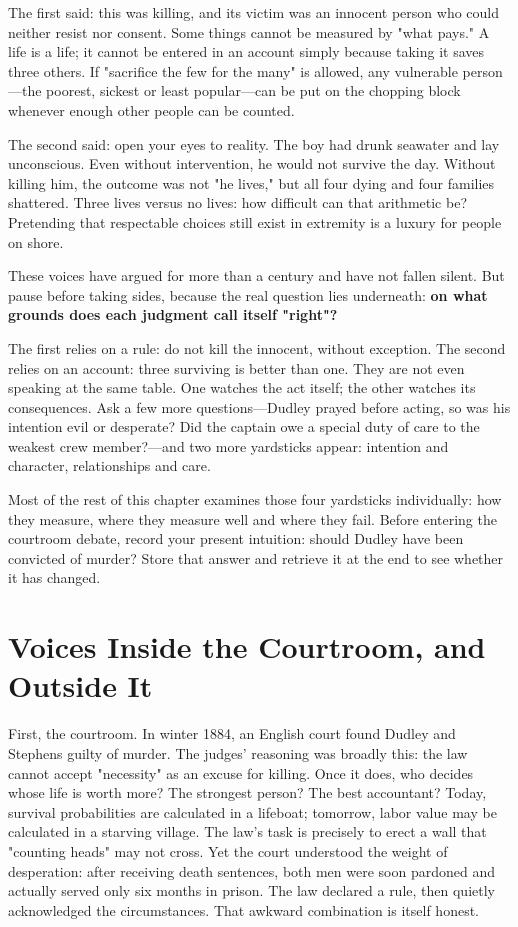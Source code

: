 The first said: this was killing, and its victim was an innocent person who could neither resist nor consent. Some things cannot be measured by "what pays." A life is a life; it cannot be entered in an account simply because taking it saves three others. If "sacrifice the few for the many" is allowed, any vulnerable person---the poorest, sickest or least popular---can be put on the chopping block whenever enough other people can be counted.

The second said: open your eyes to reality. The boy had drunk seawater and lay unconscious. Even without intervention, he would not survive the day. Without killing him, the outcome was not "he lives," but all four dying and four families shattered. Three lives versus no lives: how difficult can that arithmetic be? Pretending that respectable choices still exist in extremity is a luxury for people on shore.

These voices have argued for more than a century and have not fallen silent. But pause before taking sides, because the real question lies underneath: \textbf{on what grounds does each judgment call itself "right"?}

The first relies on a rule: do not kill the innocent, without exception. The second relies on an account: three surviving is better than one. They are not even speaking at the same table. One watches the act itself; the other watches its consequences. Ask a few more questions---Dudley prayed before acting, so was his intention evil or desperate? Did the captain owe a special duty of care to the weakest crew member?---and two more yardsticks appear: intention and character, relationships and care.

Most of the rest of this chapter examines those four yardsticks individually: how they measure, where they measure well and where they fail. Before entering the courtroom debate, record your present intuition: should Dudley have been convicted of murder? Store that answer and retrieve it at the end to see whether it has changed.

\section[Voices Inside and Outside Court]{Voices Inside the Courtroom, and Outside It}
First, the courtroom. In winter 1884, an English court found Dudley and Stephens guilty of murder. The judges' reasoning was broadly this: the law cannot accept "necessity" as an excuse for killing. Once it does, who decides whose life is worth more? The strongest person? The best accountant? Today, survival probabilities are calculated in a lifeboat; tomorrow, labor value may be calculated in a starving village. The law's task is precisely to erect a wall that "counting heads" may not cross. Yet the court understood the weight of desperation: after receiving death sentences, both men were soon pardoned and actually served only six months in prison. The law declared a rule, then quietly acknowledged the circumstances. That awkward combination is itself honest.


